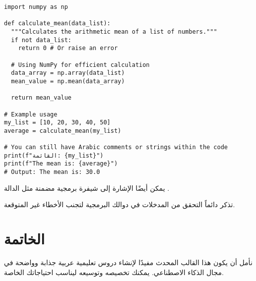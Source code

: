 \documentclass[12pt, a4paper]{article}
\begin{document}
\begin{english}
\begin{verbatim}
import numpy as np

def calculate_mean(data_list):
  """Calculates the arithmetic mean of a list of numbers."""
  if not data_list:
    return 0 # Or raise an error
  
  # Using NumPy for efficient calculation
  data_array = np.array(data_list)
  mean_value = np.mean(data_array)
  
  return mean_value

# Example usage
my_list = [10, 20, 30, 40, 50]
average = calculate_mean(my_list)

# You can still have Arabic comments or strings within the code
print(f"القائمة: {my_list}") 
print(f"The mean is: {average}") 
# Output: The mean is: 30.0
\end{verbatim}
\end{english}

يمكن أيضًا الإشارة إلى شيفرة برمجية مضمنة مثل الدالة \textenglish{}.

\begin{highlightbox}
تذكر دائماً التحقق من المدخلات في دوالك البرمجية لتجنب الأخطاء غير المتوقعة.
\end{highlightbox}

\section{الخاتمة}

نأمل أن يكون هذا القالب المحدث مفيدًا لإنشاء دروس تعليمية عربية جذابة وواضحة في مجال الذكاء الاصطناعي. يمكنك تخصيصه وتوسيعه ليناسب احتياجاتك الخاصة.


\newpage
\printbibliography %
\end{document}
